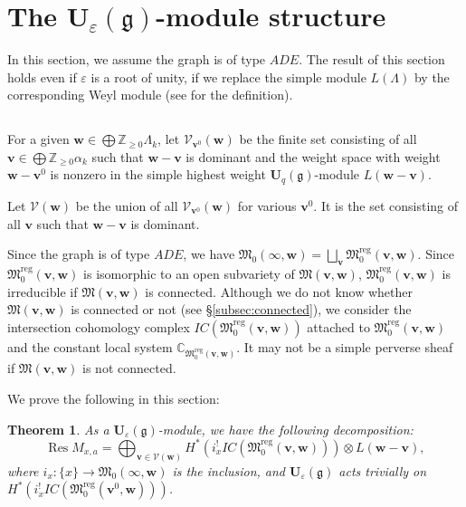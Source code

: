 \documentclass[12pt]{amsart}
\def\Bbb{\mathbb}
\def\frak{\mathfrak}
\newtheorem{Theorem}[equation]{Theorem}
\theoremstyle{definition}
\theoremstyle{remark}
\numberwithin{equation}{subsection}
\newcommand{\subsecref}[1]{\S\ref{#1}}
\newcommand{\C}{{\Bbb C}}
\newcommand{\Z}{{\Bbb Z}}
\newcommand{\M}{{\frak M}} %
\newcommand{\Mreg}{{\frak M_0^{\operatorname{reg}}}}
\newcommand{\bv}{{\mathbf v}} %
\newcommand{\bw}{{\mathbf w}} %
\newcommand{\Uq}{{\mathbf U}_q(\mathfrak g)} %
\newcommand{\Ue}{{\mathbf U}_{\varepsilon}(\mathfrak g)}
\begin{document}
\section{The $\Ue$-module structure}\label{sec:Ue}

In this section, we assume the graph is of type $ADE$.
%
The result of this section holds even if $\varepsilon$ is a root of
unity, if we replace the simple module $L(\Lambda)$ by the
corresponding Weyl module (see \cite[11.2]{CP} for the definition).

\subsection{}
For a given $\bw\in\bigoplus\Z_{\ge 0}\Lambda_k$,
let $\mathcal V_{\bv^0}(\bw)$ be the finite set consisting of all
$\bv\in\bigoplus \Z_{\ge 0}\alpha_k$ such that $\bw - \bv$ is
dominant and the weight space with weight $\bw - \bv^0$ is
nonzero in the simple highest weight $\Uq$-module $L(\bw-\bv)$.

Let $\mathcal V(\bw)$ be the union of all $\mathcal V_{\bv^0}(\bw)$ for
various $\bv^0$.
%
It is the set consisting of all $\bv$ such that $\bw - \bv$ is 
dominant.

Since the graph is of type $ADE$, we have
$\M_0(\infty,\bw) = \bigsqcup_{\bv} \Mreg(\bv,\bw)$.
Since $\Mreg(\bv,\bw)$ is isomorphic to an open subvariety of
$\M(\bv,\bw)$, $\Mreg(\bv,\bw)$ is irreducible if $\M(\bv,\bw)$ is
connected.
%
Although we do not know whether $\M(\bv,\bw)$ is connected or not (see
\subsecref{subsec:connected}), we consider the intersection cohomology
complex $IC(\Mreg(\bv,\bw))$ attached to $\Mreg(\bv,\bw)$ and the
constant local system $\C_{\Mreg(\bv,\bw)}$. It may not be a simple
perverse sheaf if $\M(\bv,\bw)$ is not connected.

We prove the following in this section:
\begin{Theorem}\label{thm:UqmoduleStr}
As a $\Ue$-module, we have the following decomposition:
\begin{equation*}
  \operatorname{Res}M_{x,a} = \bigoplus_{\bv\in\mathcal V(\bw)}
      H^*(i_x^! IC(\Mreg(\bv,\bw)))\otimes L(\bw - \bv),
\end{equation*}
where $i_x\colon\{x\}\to \M_0(\infty,\bw)$ is the inclusion,
and $\Ue$ acts trivially on $H^*(i_x^! IC(\Mreg(\bv^0,\bw)))$.
\end{Theorem}
\end{document}
